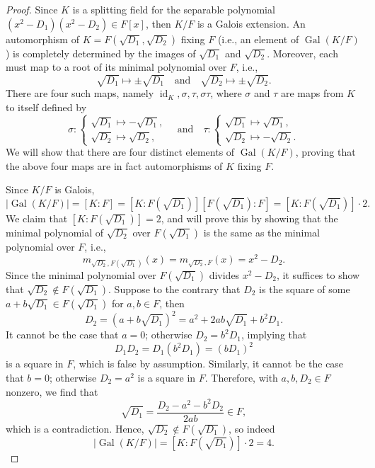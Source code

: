 \documentclass[12pt]{article}
\theoremstyle{definition}
\newcommand{\isp}[1]{\quad\text{#1}\quad}
\newcommand{\<}{\langle}
\renewcommand{\>}{\rangle}
\DeclareMathOperator{\id}{id}
\DeclareMathOperator{\Gal}{Gal}
\begin{document}
\begin{proof}
    Since $K$ is a splitting field for the separable polynomial $(x^2 - D_1)(x^2 - D_2) \in F[x]$, then $K/F$ is a Galois extension. An automorphism of $K = F(\sqrt{D_1}, \sqrt{D_2})$ fixing $F$ (i.e., an element of $\Gal(K/F)$) is completely determined by the images of $\sqrt{D_1}$ and $\sqrt{D_2}$. Moreover, each must map to a root of its minimal polynomial over $F$, i.e.,
    \[
        \sqrt{D_1} \mapsto \pm\sqrt{D_1} \isp{and} \sqrt{D_2} \mapsto \pm\sqrt{D_2}.
    \]
    There are four such maps, namely $\id_K, \sigma, \tau, \sigma\tau$, where $\sigma$ and $\tau$ are maps from $K$ to itself defined by
    \[
        \sigma : \begin{cases}
            \sqrt{D_1} \mapsto -\sqrt{D_1}, \\
            \sqrt{D_2} \mapsto \sqrt{D_2},
        \end{cases}
        \isp{and}
        \tau : \begin{cases}
            \sqrt{D_1} \mapsto \sqrt{D_1}, \\
            \sqrt{D_2} \mapsto -\sqrt{D_2}.
        \end{cases}
    \]
    We will show that there are four distinct elements of $\Gal(K/F)$, proving that the above four maps are in fact automorphisms of $K$ fixing $F$.

    Since $K/F$ is Galois,
    \[
        |\Gal(K/F)| = [K : F] = [K : F(\sqrt{D_1})][F(\sqrt{D_1}) : F] = [K : F(\sqrt{D_1})] \cdot 2.
    \]
    We claim that $[K : F(\sqrt{D_1})] = 2$, and will prove this by showing that the minimal polynomial of $\sqrt{D_2}$ over $F(\sqrt{D_1})$ is the same as the minimal polynomial over $F$, i.e.,
    \[
        m_{\sqrt{D_2}, F(\sqrt{D_1})}(x) = m_{\sqrt{D_2}, F}(x) = x^2 - D_2.
    \]
    Since the minimal polynomial over $F(\sqrt{D_1})$ divides $x^2 - D_2$, it suffices to show that $\sqrt{D_2} \notin F(\sqrt{D_1})$. Suppose to the contrary that $D_2$ is the square of some $a + b\sqrt{D_1} \in F(\sqrt{D_1})$ for $a, b \in F$, then
    \[
        D_2 = (a + b\sqrt{D_1})^2 = a^2 + 2ab\sqrt{D_1} + b^2D_1.
    \]
    It cannot be the case that $a = 0$; otherwise $D_2 = b^2D_1$, implying that
    \[
        D_1D_2 = D_1(b^2D_1) = (bD_1)^2
    \]
    is a square in $F$, which is false by assumption. Similarly, it cannot be the case that $b = 0$; otherwise $D_2 = a^2$ is a square in $F$. Therefore, with $a, b, D_2 \in F$ nonzero, we find that
    \[
        \sqrt{D_1} = \frac{D_2 - a^2 - b^2D_2}{2ab} \in F,
    \]
    which is a contradiction. Hence, $\sqrt{D_2} \notin F(\sqrt{D_1})$, so indeed
    \[
        |\Gal(K/F)| = [K : F(\sqrt{D_1})] \cdot 2 = 4.
    \]


\end{proof}
\end{document}
